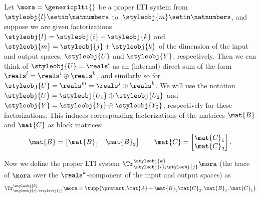 \begin{definition}\label{def:trace-lti-prop}
    Let $\mora = \genericplti{}$ be a proper LTI system from $\styleobj{l}\setin \natnumbers$ to~$\styleobj{m}\setin \natnumbers$, and suppose we are given factorizations $\styleobj{l} = \styleobj{i} + \styleobj{k}$ and $\styleobj{m} = \styleobj{j} + \styleobj{k}$ of the dimension of the input and output spaces, $\styleobj{U}$ and $\styleobj{Y}$, respectively. Then we can think of $\styleobj{U} = \reals^l$ as an (internal) direct sum of the form $\reals^l = \reals^i \oplus \reals^k$, and similarly so for $\styleobj{U} = \reals^m = \reals^j \oplus \reals^k$. We will use the notation $\styleobj{U} = \styleobj{U_1} \oplus \styleobj{U_2}$ and $\styleobj{Y} = \styleobj{Y_1} \oplus \styleobj{Y_2}$, respectively for these factorizations. This induces corresponding factorizations of the matrices $\mat{B}$ and $\mat{C}$ as block matrices: 
    \begin{equation}
\mat{B} = 
\begin{bmatrix}
\mat{B}_1 & \mat{B}_2
\end{bmatrix}
\qquad 
\mat{C} = 
\begin{bmatrix}
\mat{C}_1 \\
\mat{C}_2
\end{bmatrix}.
\end{equation}

   
 Now we define the proper LTI system $\Tr_{\styleobj{i},\styleobj{j}}^{\styleobj{k}}\mora$ (the trace of $\mora$ over the $\reals^k$-component of the input and output spaces) as
   \begin{equation}\label{eq:proper-LTI-trace-formula}
        \Tr_{\styleobj{i},\styleobj{j}}^{\styleobj{k}}\mora = \tupp{\prstart,\mat{A} + \mat{B}_2 \mat{C}_2, \mat{B}_1,\mat{C}_1}
    \end{equation}
% 
\end{definition}


